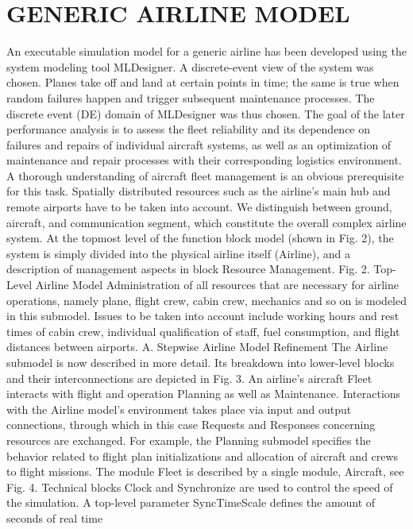 \section*{GENERIC AIRLINE MODEL}

An executable simulation model for a generic airline has
been developed using the system modeling tool MLDesigner.
A discrete-event view of the system was chosen. Planes take
off and land at certain points in time; the same is true when
random failures happen and trigger subsequent maintenance
processes. The discrete event (DE) domain of MLDesigner was
thus chosen.
The goal of the later performance analysis is to assess
the fleet reliability and its dependence on failures and repairs
of individual aircraft systems, as well as an optimization of
maintenance and repair processes with their corresponding
logistics environment. A thorough understanding of aircraft
fleet management is an obvious prerequisite for this task.
Spatially distributed resources such as the airline’s main hub
and remote airports have to be taken into account. We distinguish between ground, aircraft, and communication segment,
which constitute the overall complex airline system. At the
topmost level of the function block model (shown in Fig. 2),
the system is simply divided into the physical airline itself
(Airline), and a description of management aspects in block
Resource Management.
Fig. 2. Top-Level Airline Model
Administration of all resources that are necessary for airline
operations, namely plane, flight crew, cabin crew, mechanics
and so on is modeled in this submodel. Issues to be taken into
account include working hours and rest times of cabin crew,
individual qualification of staff, fuel consumption, and flight
distances between airports.
A. Stepwise Airline Model Refinement
The Airline submodel is now described in more detail. Its
breakdown into lower-level blocks and their interconnections
are depicted in Fig. 3. An airline’s aircraft Fleet interacts
with flight and operation Planning as well as Maintenance.
Interactions with the Airline model’s environment takes place
via input and output connections, through which in this
case Requests and Responses concerning resources are
exchanged. For example, the Planning submodel specifies the
behavior related to flight plan initializations and allocation of
aircraft and crews to flight missions.
The module Fleet is described by a single module, Aircraft,
see Fig. 4. Technical blocks Clock and Synchronize are used
to control the speed of the simulation. A top-level parameter
SyncTimeScale defines the amount of seconds of real time
